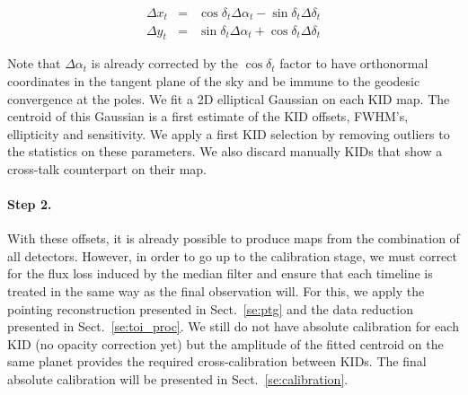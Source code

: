 \begin{eqnarray}
\Delta x_t &=& \cos\delta_t \Delta\alpha_t - \sin \delta_t\Delta \delta_t \nonumber \\
\Delta y_t &=& \sin\delta_t \Delta\alpha_t + \cos \delta_t\Delta \delta_t \nonumber
\end{eqnarray}

Note that $\Delta\alpha_t$ is already corrected by the $\cos\delta_t$ factor to
have orthonormal coordinates in the tangent plane of the sky and be immune to
the geodesic convergence at the poles.
We fit a 2D elliptical Gaussian on
each KID map. The centroid of this Gaussian is a first estimate of the KID
offsets, FWHM's, ellipticity and sensitivity. We apply a first KID selection by
removing outliers to the statistics on these parameters. We also discard
manually KIDs that show a cross-talk counterpart on their map.

\paragraph{Step 2.} With these offsets, it is already possible to produce maps
from the combination of all detectors. However, in order to go up to
the calibration stage, we must correct for the flux loss induced by
the median filter and ensure that each timeline is treated in the same
way as the final observation will. For this, we apply the pointing
reconstruction presented in Sect.~\ref{se:ptg} and the data reduction
presented in Sect.~\ref{se:toi_proc}. We still do not have absolute
calibration for each KID (no opacity correction yet) but the amplitude
of the fitted centroid on the same planet provides the required
cross-calibration between KIDs. The final absolute calibration will be
presented in Sect.~\ref{se:calibration}.\\

